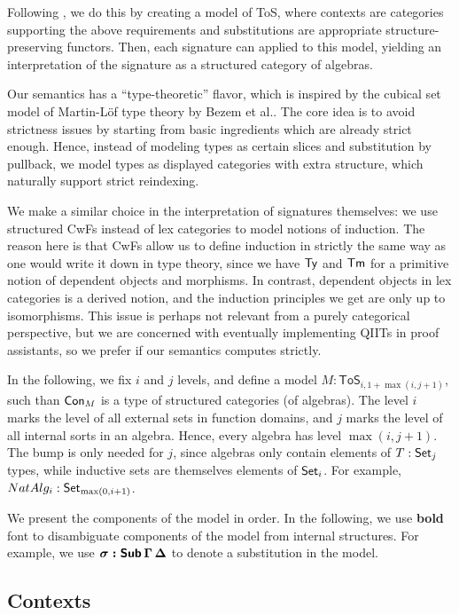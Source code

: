 \documentclass[sigplan,review,anonymous]{acmart}\settopmatter{printfolios=true,printccs=false,printacmref=false}
\newcommand{\ToS}{\mathsf{ToS}}
\begin{document}
Following \cite{kaposi2019constructing}, we do this by creating a model of ToS,
where contexts are categories supporting the above requirements and
substitutions are appropriate structure-preserving functors. Then, each
signature can applied to this model, yielding an interpretation of the signature
as a structured category of algebras.

Our semantics has a ``type-theoretic'' flavor, which is inspired by the cubical
set model of Martin-Löf type theory by Bezem et al.\cite{cubical}. The core idea
is to avoid strictness issues by starting from basic ingredients which are already
strict enough. Hence, instead of modeling types as certain slices and
substitution by pullback, we model types as displayed categories with extra
structure, which naturally support strict reindexing.

We make a similar choice in the interpretation of signatures themselves: we
use structured CwFs instead of lex categories to model notions of induction. The
reason here is that CwFs allow us to define induction in strictly the same way as
one would write it down in type theory, since we have $\mathsf{Ty}$ and $\mathsf{Tm}$ for a
primitive notion of dependent objects and morphisms. In contrast, dependent
objects in lex categories is a derived notion, and the induction principles we
get are only up to isomorphisms. This issue is perhaps not relevant from a
purely categorical perspective, but we are concerned with eventually
implementing QIITs in proof assistants, so we prefer if our semantics computes
strictly.

In the following, we fix $i$ and $j$ levels, and define a model $M : \ToS_{i,
  1+\max(i,j+1)}$, such than $\mathsf{Con}_M$ is a type of structured categories (of
algebras). The level $i$ marks the level of all external sets in function
domains, and $j$ marks the level of all internal sorts in an algebra. Hence,
every algebra has level $\max(i,j+1)$. The bump is only needed for $j$, since
algebras only contain elements of $T : \mathsf{Set}_j$ types, while inductive sets are
themselves elements of $\mathsf{Set}_i$. For example, $NatAlg_i : \mathsf{Set}_{\max(0, i+1)}$.

We present the components of the model in order. In the following, we use
\textbf{bold} font to disambiguate components of the model from internal
structures. For example, we use $\boldsymbol{\sigma : \mathsf{Sub}\,\Gamma\,\Delta}$
to denote a substitution in the model.


\subsection{Contexts}
\end{document}
